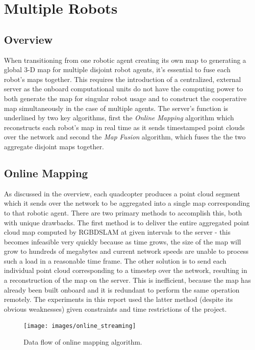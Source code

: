 \documentclass[letterpaper, oneside, 10pt]{report}
\begin{document}
\chapter{Multiple Robots}

\section{Overview}

When transitioning from one robotic agent creating its own map to generating a global 3-D map for multiple disjoint robot agents, it's essential to fuse each robot's maps together. This requires the introduction of a centralized, external server as the onboard computational units do not have the computing power to both generate the map for singular robot usage and to construct the cooperative map simultaneously in the case of multiple agents. The server's function is underlined by two key algorithms, first the \textsl{Online Mapping} algorithm which reconstructs each robot's map in real time as it sends timestamped point clouds over the network and second the \textsl{Map Fusion} algorithm, which fuses the the two aggregate disjoint maps together.

\section{Online Mapping}
As discussed in the overview, each quadcopter produces a point cloud segment which it sends over the network to be aggregated into a single map corresponding to that robotic agent. There are two primary methods to accomplish this, both with unique drawbacks. The first method is to deliver the entire aggregated point cloud map computed by RGBDSLAM at given intervals to the server - this becomes infeasible very quickly because as time grows, the size of the map will grow to hundreds of megabytes and current network speeds are unable to process such a load in a reasonable time frame. The other solution is to send each individual point cloud corresponding to a timestep over the network, resulting in a reconstruction of the map on the server. This is inefficient, because the map has already been built onboard and it is redundant to perform the same operation remotely. The experiments in this report used the latter method (despite its obvious weaknesses) given constraints and time restrictions of the project.

\begin{figure}[h!]
 \caption{Data flow of online mapping algorithm.}
 \centering
   \texttt{[image: images/online\_streaming]}
 \label{fig: online stream.}
\end{figure}
\end{document}
